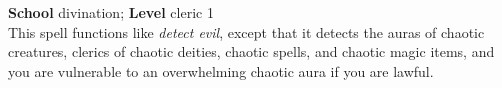 \textbf{School} divination; \textbf{Level} cleric 1\\
This spell functions like \textit{detect evil}, except that it detects the auras of chaotic creatures, clerics of chaotic deities, chaotic spells, and chaotic magic items, and you are vulnerable to an overwhelming chaotic aura if you are lawful.\\
